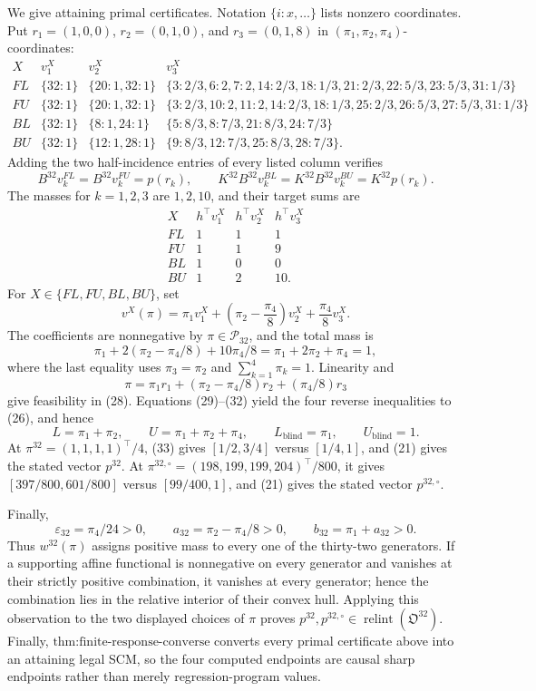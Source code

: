 We give attaining primal certificates.  Notation \(\{i:x,\ldots\}\) lists nonzero coordinates.  Put \(r_1=(1,0,0)\), \(r_2=(0,1,0)\), and \(r_3=(0,1,8)\) in \((\pi_1,\pi_2,\pi_4)\)-coordinates:
\[
\begin{array}{c|c|c|l}
X&v_1^X&v_2^X&v_3^X\\\hline
FL&\{32:1\}&\{20:1,32:1\}&
\{3:2/3,6:2,7:2,14:2/3,18:1/3,21:2/3,22:5/3,23:5/3,31:1/3\}\\
FU&\{32:1\}&\{20:1,32:1\}&
\{3:2/3,10:2,11:2,14:2/3,18:1/3,25:2/3,26:5/3,27:5/3,31:1/3\}\\
BL&\{32:1\}&\{8:1,24:1\}&
\{5:8/3,8:7/3,21:8/3,24:7/3\}\\
BU&\{32:1\}&\{12:1,28:1\}&
\{9:8/3,12:7/3,25:8/3,28:7/3\}.
\end{array}
\tag{27}
\]
Adding the two half-incidence entries of every listed column verifies
\[
B^{32}v_k^{FL}=B^{32}v_k^{FU}=p(r_k),\qquad
K^{32}B^{32}v_k^{BL}=K^{32}B^{32}v_k^{BU}=K^{32}p(r_k).
\tag{28}
\]
The masses for \(k=1,2,3\) are \(1,2,10\), and their target sums are
\[
\begin{array}{c|ccc}
X&h^{\top}v_1^X&h^{\top}v_2^X&h^{\top}v_3^X\\\hline
FL&1&1&1\\ FU&1&1&9\\ BL&1&0&0\\ BU&1&2&10.
\end{array}
\tag{29}
\]
For \(X\in\{FL,FU,BL,BU\}\), set
\[
v^X(\pi)=\pi_1v_1^X+\left(\pi_2-\frac{\pi_4}{8}\right)v_2^X
+\frac{\pi_4}{8}v_3^X.
\tag{30}
\]
The coefficients are nonnegative by \(\pi\in\mathcal P_{32}\), and the total mass is
\[
\pi_1+2(\pi_2-\pi_4/8)+10\pi_4/8
=\pi_1+2\pi_2+\pi_4=1,
\tag{31}
\]
where the last equality uses \(\pi_3=\pi_2\) and \(\sum_{k=1}^4\pi_k=1\).  Linearity and
\[
\pi=\pi_1r_1+(\pi_2-\pi_4/8)r_2+(\pi_4/8)r_3
\tag{32}
\]
give feasibility in (28).  Equations (29)--(32) yield the four reverse inequalities to (26), and hence
\[
L=\pi_1+\pi_2,\qquad U=\pi_1+\pi_2+\pi_4,\qquad
L_{\mathrm{blind}}=\pi_1,\qquad U_{\mathrm{blind}}=1.
\tag{33}
\]
At \(\pi^{32}=(1,1,1,1)^{\top}/4\), (33) gives \([1/2,3/4]\) versus \([1/4,1]\), and (21) gives the stated vector \(p^{32}\).  At \(\pi^{32,\circ}=(198,199,199,204)^{\top}/800\), it gives \([397/800,601/800]\) versus \([99/400,1]\), and (21) gives the stated vector \(p^{32,\circ}\).

Finally,
\[
\varepsilon_{32}=\pi_4/24>0,
\qquad a_{32}=\pi_2-\pi_4/8>0,
\qquad b_{32}=\pi_1+a_{32}>0.
\tag{34}
\]
Thus \(w^{32}(\pi)\) assigns positive mass to every one of the thirty-two generators.  If a supporting affine functional is nonnegative on every generator and vanishes at their strictly positive combination, it vanishes at every generator; hence the combination lies in the relative interior of their convex hull.  Applying this observation to the two displayed choices of \(\pi\) proves \(p^{32},p^{32,\circ}\in\operatorname{relint}(\mathfrak O^{32})\).  Finally, \(\text{thm:finite-response-converse}\) converts every primal certificate above into an attaining legal SCM, so the four computed endpoints are causal sharp endpoints rather than merely regression-program values.